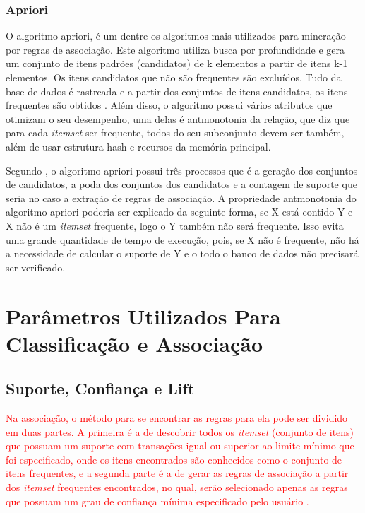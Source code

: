 \subsubsection{Apriori}

\par
O algoritmo apriori, é um dentre os algoritmos mais utilizados para mineração por regras de associação. Este algoritmo utiliza busca por profundidade e gera um conjunto de itens padrões (candidatos) de k elementos a partir de itens k-1 elementos. Os itens candidatos que não são frequentes são excluídos. Tudo da base de dados é rastreada e a partir dos conjuntos de itens candidatos, os itens frequentes são obtidos \cite{Vasconcelos2004}. Além disso, o algoritmo possui vários atributos que otimizam o seu desempenho, uma delas é antmonotonia da relação, que diz que para cada \textit{itemset} ser frequente, todos do seu subconjunto devem ser também, além de usar estrutura hash e recursos da memória principal.

\par
Segundo , o algoritmo apriori possui três processos que é a geração dos conjuntos de candidatos, a poda dos conjuntos dos candidatos e a contagem de suporte que seria no caso a extração de regras de associação. A propriedade antmonotonia do algoritmo apriori poderia ser explicado da seguinte forma, se X está contido Y e X não é um \textit{itemset} frequente, logo o Y também não será frequente. Isso evita uma grande quantidade de tempo de execução, pois, se X não é frequente, não há a necessidade de calcular o suporte de Y e o todo o banco de dados não precisará ser verificado.


\section{Parâmetros Utilizados Para Classificação e Associação}

\subsection{Suporte, Confiança e Lift}

\par
\textcolor{red}{Na associação, o método para se encontrar as regras para ela pode ser dividido em duas partes. A primeira é a de descobrir todos os \textit{itemset} (conjunto de itens) que possuam um suporte com transações igual ou superior ao limite mínimo que foi especificado, onde os itens encontrados são conhecidos como o conjunto de itens frequentes, e a segunda parte é a de gerar as regras de associação a partir dos \textit{itemset} frequentes encontrados, no qual, serão selecionado apenas as regras que possuam um grau de confiança mínima especificado pelo usuário \cite{Vasconcelos2004, LeandroSilva2014}.}


